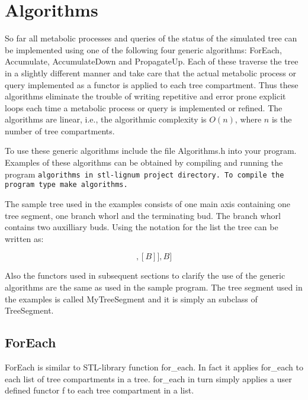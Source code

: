\chapter{Algorithms}

So  far all   metabolic processes and   queries  of the  status of the
simulated  tree can be  implemented using  one  of the following  four
generic    algorithms:   ForEach,  Accumulate,   AccumulateDown    and
PropagateUp.  Each of these traverse the tree  in a slightly different
manner  and take   care that  the actual   metabolic process or  query
implemented  as a functor  is applied to  each tree compartment.  Thus
these algorithms eliminate the trouble of writing repetitive and error
prone explicit loops  each time    a  metabolic process or query    is
implemented  or refined.      The algorithms are    linear,  i.e., the
algorithmic  complexity is $O(n)$, where  $n$   is the number of  tree
compartments.

To   use these generic  algorithms  include the file Algorithms.h into
your   program.   Examples of these   algorithms   can be  obtained by
compiling  and running  the  program \tt algorithms  \rm in stl-lignum
project   directory.   To    compile    the program type    \tt   make
algorithms\rm.

The sample  tree  used in  the   examples consists  of one  main  axis
containing one tree segment, one branch whorl and the terminating bud.
The branch whorl contains two  auxilliary buds. Using the notation for
the list the tree can be written as:

\begin{displaymath}
[TS,[[B],[B]],B]
\end{displaymath}

Also the  functors used in subsequent  sections to clarify  the use of
the generic algorithms are the same as used in the sample program. The
tree segment  used in the examples  is called MyTreeSegment  and it is
simply an subclass of TreeSegment.
 
\section{ForEach}

ForEach is similar to  STL-library  function  for\_each.  In fact   it
applies  for\_each to  each  list  of  tree  compartments  in a  tree.
for\_each in turn simply applies a user defined functor f to each tree
compartment in a list.

